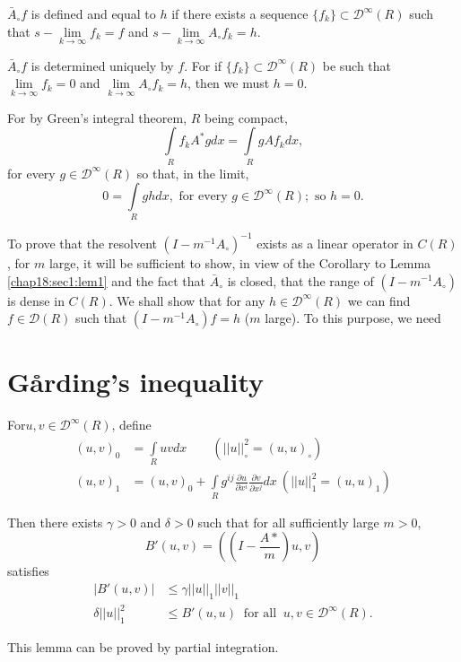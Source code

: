 $\bar{A}_\circ f$ is defined and equal to $h$ if there exists a
sequence $\{f_k\} \subset \mathscr{D}^\infty (R)$ such that $s-\lim
\limits_{k \to \infty}f_k = f$ and $s-\lim \limits_{k \to
 \infty}A_\circ f_k = h$. 

$\bar{A}_\circ f$ is determined uniquely by $f$. For if $\{f_k\}
\subset \mathscr{D}^\infty (R)$ be such that $\lim \limits_{k \to
 \infty}f_k =0$ and $\lim \limits_{k \to \infty} A_\circ f_k =h$,
then we must $h = 0$. 

For by Green's integral theorem, $R$ being compact,
$$
\int \limits_R f_k A^* g dx = \int \limits_R g A f_k dx,
$$
for every $g \in \mathscr{D}^\infty (R)$ so that, in the limit,
 $$
 0 = \int \limits_R g h d x, \text{ for every }g \in
 \mathscr{D}^\infty (R); \text{ so } h =0. 
 $$
 
To prove that the resolvent $(I - m^{-1}A_\circ )^{-1}$ exists as a
linear operator in $C (R)$, for $m$ large, it will be sufficient to
show, in view of the Corollary to Lemma \ref{chap18:sec1:lem1} and the fact that
$\bar{A}_\circ$ is closed, that the range of $(I -m^{-1} A_\circ)$ is
dense in $C(R)$. We shall show that for any $h \in \mathscr{D}^\infty
(R)$ we can find $f \in \mathscr{D}(R)$ such that $(I -m^{-1} A_\circ)
f= h$ ($m$ large). To this purpose, we need 

\section{G\r{a}rding's inequality}\label{chap18:sec2} 
 
For\pageoriginale $u, v \in \mathscr{D}^\infty (R)$, define
\begin{align*}
 (u, v)_0 & = \int \limits_R u v dx \qquad (|| u ||^2_\circ = (u,
 u)_\circ)\\ 
 (u, v)_1 & = (u, v)_0 + \int \limits_R g^{ij} \frac {\partial
  u}{\partial x^i}\frac {\partial v}{\partial x^j} dx~(|| u ||^2_1 =
 (u, u)_1) 
 \end{align*} 
 
Then there exists $\gamma > 0$ and $\delta > 0$ such that for all
sufficiently large $m > 0$, 
 $$
 B' (u, v) = \left(\left(I- \dfrac{A*}{m}\right) u, v\right)
 $$
 satisfies
\begin{align*}
 | B' (u, v)| & \leq \gamma || u ||_1 ||v||_1 \\
 \delta || u ||^2_1 & \leq B' (u, u) ~\text{ for all }~ u, v \in
 \mathscr{D}^\infty (R). 
\end{align*}
 
This lemma can be proved by partial integration.
 

